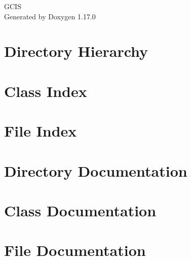 \documentclass[twoside]{book}
\newcommand{\+}{\discretionary{\mbox{\scriptsize$\hookleftarrow$}}{}{}}
\newcommand{\clearemptydoublepage}{%
    \newpage{\pagestyle{empty}\cleardoublepage}%
  }
\begin{document}
  \raggedbottom
    \hypersetup{pageanchor=false,
                bookmarksnumbered=true,
                pdfencoding=unicode
               }
  \begin{titlepage}
  \vspace*{7cm}
  \begin{center}%
  {\Large GCIS}\\
  \vspace*{1cm}
  {\large Generated by Doxygen 1.17.0}\\
  \end{center}
  \end{titlepage}
  \clearemptydoublepage
  \tableofcontents
  \clearemptydoublepage
  \hypersetup{pageanchor=true}

\chapter{Directory Hierarchy}

\chapter{Class Index}

\chapter{File Index}

\chapter{Directory Documentation}


\chapter{Class Documentation}




\chapter{File Documentation}













  \backmatter
  \newpage
  \clearemptydoublepage
  \printindex
\end{document}
